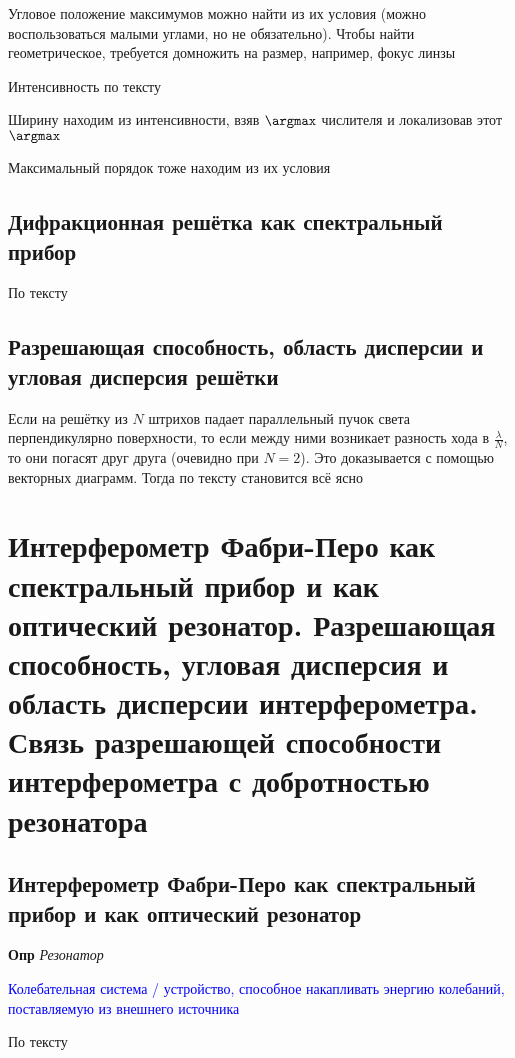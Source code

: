 \documentclass[a4paper, 14pt]{article}
\begin{document}
    Угловое положение максимумов можно найти из их условия (можно воспользоваться малыми углами, но не обязательно).
    Чтобы найти геометрическое, требуется домножить на размер, например, фокус линзы
    
    Интенсивность по тексту
    
    Ширину находим из интенсивности, взяв $\argmax$ числителя и локализовав этот $\argmax$
    
    Максимальный порядок тоже находим из их условия
    
    \subsection{Дифракционная решётка как спектральный прибор}
    
    По тексту
    
    \subsection{Разрешающая способность, область дисперсии и угловая дисперсия решётки}
    
    Если на решётку из $N$ штрихов падает параллельный пучок света перпендикулярно поверхности, то если между ними
    возникает разность хода в $\frac{\lambda}{N}$, то они погасят друг друга (очевидно при $N = 2$).
    Это доказывается с помощью векторных диаграмм.
    Тогда по тексту становится всё ясно
    
    \section{Интерферометр Фабри-Перо как спектральный прибор и как оптический резонатор.
    Разрешающая способность, угловая дисперсия и область дисперсии интерферометра.
    Связь разрешающей способности интерферометра с добротностью резонатора}
    
    \subsection{Интерферометр Фабри-Перо как спектральный прибор и как оптический резонатор}
    
    \textbf{Опр} \textit{Резонатор}
    
    \textcolor{blue}{Колебательная система / устройство, способное накапливать энергию колебаний, поставляемую из
    внешнего источника}
    
    По тексту
    
\end{document}
